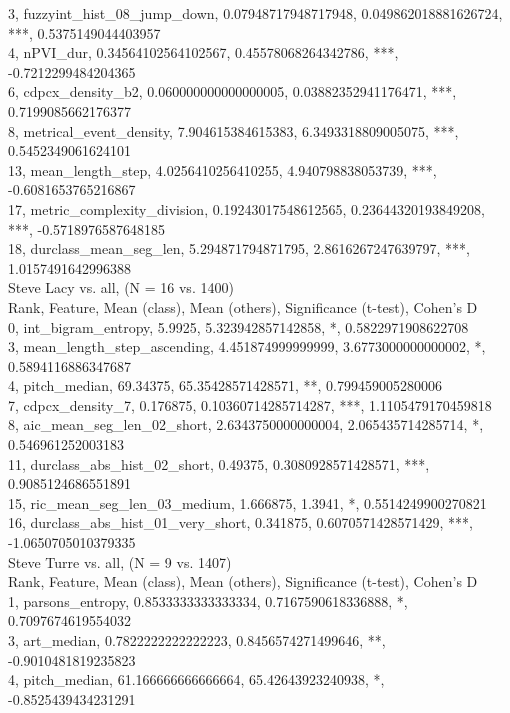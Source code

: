 3, fuzzyint_hist_08_jump_down, 0.07948717948717948, 0.049862018881626724, ***, 0.5375149044403957\\
4, nPVI_dur, 0.34564102564102567, 0.45578068264342786, ***, -0.7212299484204365\\
6, cdpcx_density_b2, 0.060000000000000005, 0.03882352941176471, ***, 0.7199085662176377\\
8, metrical_event_density, 7.904615384615383, 6.3493318809005075, ***, 0.5452349061624101\\
13, mean_length_step, 4.0256410256410255, 4.940798838053739, ***, -0.6081653765216867\\
17, metric_complexity_division, 0.19243017548612565, 0.23644320193849208, ***, -0.5718976587648185\\
18, durclass_mean_seg_len, 5.294871794871795, 2.8616267247639797, ***, 1.0157491642996388\\
Steve Lacy vs. all, (N = 16 vs. 1400)\\
Rank, Feature, Mean (class), Mean (others), Significance (t-test), Cohen's D\\
0, int_bigram_entropy, 5.9925, 5.323942857142858, *, 0.5822971908622708\\
3, mean_length_step_ascending, 4.451874999999999, 3.6773000000000002, *, 0.5894116886347687\\
4, pitch_median, 69.34375, 65.35428571428571, **, 0.799459005280006\\
7, cdpcx_density_7, 0.176875, 0.10360714285714287, ***, 1.1105479170459818\\
8, aic_mean_seg_len_02_short, 2.6343750000000004, 2.065435714285714, *, 0.546961252003183\\
11, durclass_abs_hist_02_short, 0.49375, 0.3080928571428571, ***, 0.9085124686551891\\
15, ric_mean_seg_len_03_medium, 1.666875, 1.3941, *, 0.5514249900270821\\
16, durclass_abs_hist_01_very_short, 0.341875, 0.6070571428571429, ***, -1.0650705010379335\\
Steve Turre vs. all, (N = 9 vs. 1407)\\
Rank, Feature, Mean (class), Mean (others), Significance (t-test), Cohen's D\\
1, parsons_entropy, 0.8533333333333334, 0.7167590618336888, *, 0.7097674619554032\\
3, art_median, 0.7822222222222223, 0.8456574271499646, **, -0.9010481819235823\\
4, pitch_median, 61.166666666666664, 65.42643923240938, *, -0.8525439434231291\\

